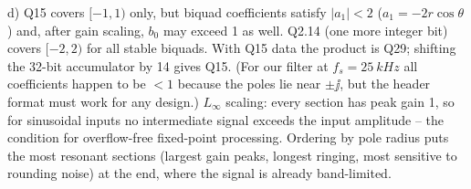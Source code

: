 \begin{solution}
d) Q15 covers $[-1,1)$ only, but biquad coefficients satisfy $|a_1|<2$
($a_1=-2r\cos\theta$) and, after gain scaling, $b_0$ may exceed 1 as well.
Q2.14 (one more integer bit) covers $[-2,2)$ for all stable biquads. With Q15
data the product is Q29; shifting the 32-bit accumulator by 14 gives Q15.
(For our filter at $f_s=\SI{25}{kHz}$ all coefficients happen to be $<1$
because the poles lie near $\pm\jj$, but the header format must work for any
design.) $L_\infty$ scaling: every section has peak gain 1, so for sinusoidal
inputs no intermediate signal exceeds the input amplitude -- the condition for
overflow-free fixed-point processing. Ordering by pole radius puts the most
resonant sections (largest gain peaks, longest ringing, most sensitive to
rounding noise) at the end, where the signal is already band-limited.


\end{solution}
